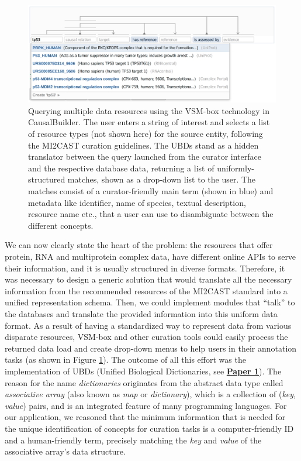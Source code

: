 \documentclass[
  12pt,
]{book}
\begin{document}
\begin{figure}
\includegraphics[width=1\linewidth]{img/causalBuilder_screenshot} \caption{Querying multiple data resources using the VSM-box technology in CausalBuilder. The user enters a string of interest and selects a list of resource types (not shown here) for the source entity, following the MI2CAST curation guidelines. The UBDs stand as a hidden translator between the query launched from the curator interface and the respective database data, returning a list of uniformly-structured matches, shown as a drop-down list to the user. The matches consist of a curator-friendly main term (shown in blue) and metadata like identifier, name of species, textual description, resource name etc., that a user can use to disambiguate between the different concepts.}\label{fig:fig3}
\end{figure}

\newpage

We can now clearly state the heart of the problem: the resources that offer protein, RNA and multiprotein complex data, have different online APIs to serve their information, and it is usually structured in diverse formats.
Therefore, it was necessary to design a generic solution that would translate all the necessary information from the recommended resources of the MI2CAST standard into a unified representation schema.
Then, we could implement modules that ``talk'' to the databases and translate the provided information into this uniform data format.
As a result of having a standardized way to represent data from various disparate resources, VSM-box and other curation tools could easily process the returned data load and create drop-down menus to help users in their annotation tasks (as shown in Figure \ref{fig:fig3}).
The outcome of all this effort was the implementation of UBDs (Unified Biological Dictionaries, see \textbf{\protect\hyperlink{Paper1}{Paper 1}}).
The reason for the name \emph{dictionaries} originates from the abstract data type called \emph{associative array} (also known as \emph{map} or \emph{dictionary}), which is a collection of (\emph{key, value}) pairs, and is an integrated feature of many programming languages.
For our application, we reasoned that the minimum information that is needed for the unique identification of concepts for curation tasks is a computer-friendly ID and a human-friendly term, precisely matching the \emph{key} and \emph{value} of the associative array's data structure.
\end{document}
